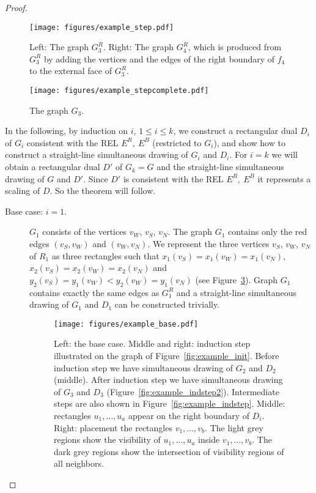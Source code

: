 \documentclass{llncs}
\begin{document}
\begin{proof}
\begin{figure}[htb]
\centering
\texttt{[image: figures/example\_step.pdf]}
\caption{Left: The graph $G^R_3$. Right: The graph $G^R_4$, which is produced from $G^R_3$ by adding the vertices and the edges of the right boundary of $f_4$ to the external face of $G^R_3$.}
\label{fig:example_subgraph}
\end{figure}

\begin{figure}[htb]
\centering
\texttt{[image: figures/example\_stepcomplete.pdf]}
\caption{The graph $G_3$.}
\label{fig:example_step}
\end{figure}

In the following, by induction on $i$, $1\leq i \leq k$, we construct a rectangular dual $D_i$ of $G_i$ 
consistent with the REL $E^R,~E^B$ (restricted to $G_i$), and show how to construct a straight-line simultaneous drawing of $G_i$ and $D_i$. For $i=k$ we will obtain a rectangular dual $D'$ of $G_k=G$ and the straight-line simultaneous drawing of $G$ and $D'$. Since $D'$ is consistent with the REL $E^R,~E^B$ it represents a scaling of $D$. So the theorem will follow.

 \begin{description}
\item[Base case: $i=1$.]   $G_1$  consists of the vertices $v_W$, $v_S$, $v_N$.  The graph $G_1$ contains only the red edges $(v_S,v_W)$  and $(v_W,v_N)$.  We represent the three vertices $v_S$, $v_W$, $v_N$ of $R_1$ as three rectangles such that $x_1(v_S)=x_1(v_W)=x_1(v_N)$, $x_2(v_S)=x_2(v_W)=x_2(v_N)$  and $y_2(v_S)=y_1(v_W)<y_2(v_W)=y_1(v_N)$ (see Figure~\ref{fig:example_base}). Graph $G_1$ contains exactly the same edges as $G_1^R$ and a straight-line simultaneous drawing of $G_1$ and $D_1$ can be constructed trivially.

\begin{figure}[htb]
\centering
\texttt{[image: figures/example\_base.pdf]}
\caption{Left: the base case. Middle and right: induction step illustrated on the graph of Figure~\ref{fig:example_init}. Before induction step we have  simultaneous drawing of $G_2$ and $D_2$ (middle). After induction step we have simultaneous drawing of $G_3$ and  $D_3$ (Figure~\ref{fig:example_indstep2}). Intermediate steps are also shown in Figure~\ref{fig:example_indstep}. Middle: rectangles $u_1,\dots,u_a$ appear on the right boundary of $D_i$. Right: placement the rectangles  $v_1,\dots,v_b$. The light grey regions show the  visibility of $u_1,\dots,u_a$ inside $v_1,\dots,v_b$. The dark grey regions show the intersection of visibility regions of all neighbors. }
\label{fig:example_base} 
\end{figure}


\end{description}
\end{proof}
\end{document}
